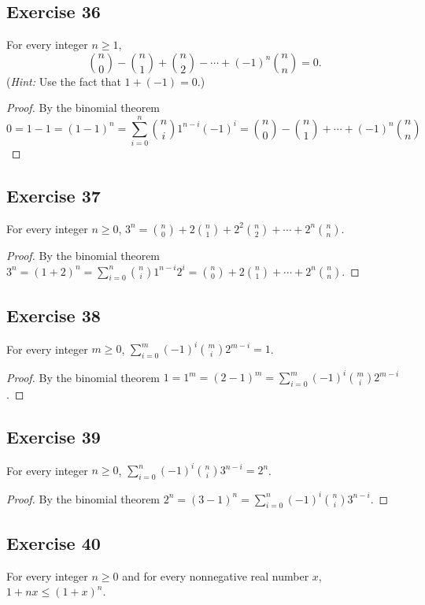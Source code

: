 \documentclass[14pt]{extarticle}
\newcommand{\dps}{\displaystyle}
\begin{document}
\subsection{Exercise 36}
For every integer \(n \geq 1\),
\[
\binom{n}{0} - \binom{n}{1} + \binom{n}{2} - \cdots + (-1)^n \binom{n}{n} = 0.
\]
({\it Hint:} Use the fact that \(1 + (-1) = 0\).)

\begin{proof}
By the binomial theorem
\[
0 = 1-1 = (1-1)^n = \sum_{i=0}^{n}\binom{n}{i}1^{n-i}(-1)^i = \binom{n}{0} - \binom{n}{1} + \cdots + (-1)^n \binom{n}{n}
\]
\end{proof}

\subsection{Exercise 37}
For every integer \(n \geq 0\), \( 3^n = \binom{n}{0} + 2\binom{n}{1} + 2^2\binom{n}{2} + \cdots + 2^n\binom{n}{n}.\)

\begin{proof}
By the binomial theorem \(\dps 3^n = (1+2)^n = \sum_{i=0}^{n}\binom{n}{i}1^{n-i}2^i = \binom{n}{0} + 2\binom{n}{1} + \cdots 
+ 2^n\binom{n}{n}\).
\end{proof}

\subsection{Exercise 38}
For every integer \(m \geq 0\), \(\dps \sum_{i=0}^{m} (-1)^i \binom{m}{i}2^{m-i} = 1\).

\begin{proof}
By the binomial theorem \(1 = 1^m = (2-1)^m = \sum_{i=0}^{m} (-1)^i \binom{m}{i}2^{m-i}\).
\end{proof}

\subsection{Exercise 39}
For every integer \(n \geq 0\), \(\dps \sum_{i=0}^{n} (-1)^i \binom{n}{i}3^{n-i} = 2^n\).

\begin{proof}
By the binomial theorem \(2^n = (3-1)^n = \sum_{i=0}^{n} (-1)^i \binom{n}{i}3^{n-i}.\)
\end{proof}

\subsection{Exercise 40}
For every integer \(n \geq 0\) and for every nonnegative real number \(x\), \(1 + nx \leq (1 + x)^n\).
\end{document}
